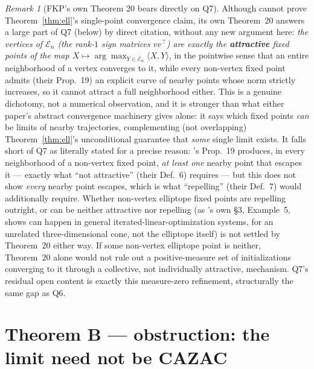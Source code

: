 \documentclass[11pt]{article}
\theoremstyle{plain}
\theoremstyle{definition}
\theoremstyle{remark}
\newtheorem{remark}[theorem]{Remark}
\newcommand{\El}{\mathcal E_n}
\begin{document}
\begin{remark}[FKP's own Theorem 20 bears directly on Q7]\label{rem:fkp-thm20}
Although \cite{FKP21} cannot prove Theorem~\ref{thm:ell}'s single-point
convergence claim, its own Theorem~20 answers a large part of Q7 (below)
by direct citation, without any new argument here: \emph{the vertices of
$\El$ (the rank-$1$ sign matrices $vv^\top$) are exactly the
\textbf{attractive} fixed points of the map $X\mapsto\arg\max_{Y\in\El}\langle
X,Y\rangle$}, in the pointwise sense that an entire neighborhood of a
vertex converges to it, while every non-vertex fixed point admits (their
Prop.~19) an explicit curve of nearby points whose norm strictly
increases, so it cannot attract a full neighborhood either. This is a
genuine dichotomy, not a numerical observation, and it is stronger than
what either paper's abstract convergence machinery gives alone: it says
which fixed points \emph{can} be limits of nearby trajectories, complementing
(not overlapping) Theorem~\ref{thm:ell}'s unconditional guarantee that
\emph{some} single limit exists. It falls short of Q7 as literally stated
for a precise reason: \cite{FKP21}'s Prop.~19 produces, in every
neighborhood of a non-vertex fixed point, \emph{at least one} nearby point
that escapes it --- exactly what ``not attractive'' (their Def.~6)
requires --- but this does not show \emph{every} nearby point escapes,
which is what ``repelling'' (their Def.~7) would additionally require.
Whether non-vertex elliptope fixed points are repelling outright, or can
be neither attractive nor repelling (as \cite{FKP21}'s own \S3, Example~5,
shows can happen in general iterated-linear-optimization systems, for an
unrelated three-dimensional cone, not the elliptope itself) is not settled
by Theorem~20 either way. If some non-vertex elliptope point is neither,
Theorem~20 alone would not rule out a positive-measure set of
initializations converging to it through a collective, not individually
attractive, mechanism. Q7's residual open content is exactly this
measure-zero refinement, structurally the same gap as Q6.
\end{remark}

\section{Theorem B --- obstruction: the limit need not be CAZAC}
\end{document}
